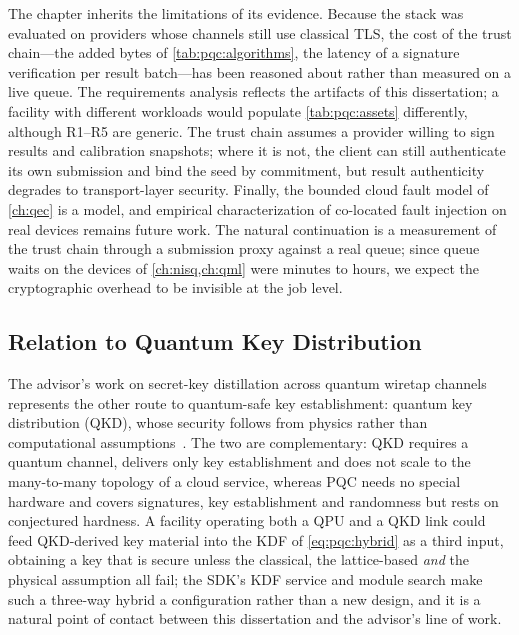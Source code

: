 The chapter inherits the limitations of its evidence. Because the stack was evaluated on providers whose channels still use classical TLS, the cost of the trust chain---the added bytes of \cref{tab:pqc:algorithms}, the latency of a signature verification per result batch---has been reasoned about rather than measured on a live queue. The requirements analysis reflects the artifacts of this dissertation; a facility with different workloads would populate \cref{tab:pqc:assets} differently, although R1--R5 are generic. The trust chain assumes a provider willing to sign results and calibration snapshots; where it is not, the client can still authenticate its own submission and bind the seed by commitment, but result authenticity degrades to transport-layer security. Finally, the bounded cloud fault model of \cref{ch:qec} is a model, and empirical characterization of co-located fault injection on real devices remains future work. The natural continuation is a measurement of the trust chain through a submission proxy against a real queue; since queue waits on the devices of \cref{ch:nisq,ch:qml} were minutes to hours, we expect the cryptographic overhead to be invisible at the job level.

\subsection{Relation to Quantum Key Distribution}\label{sec:pqc:qkd}

The advisor's work on secret-key distillation across quantum wiretap channels~\cite{pan2020secretkey} represents the other route to quantum-safe key establishment: quantum key distribution (QKD), whose security follows from physics rather than computational assumptions~\cite{bennett1984bb84,vazirani2014diqkd}. The two are complementary: QKD requires a quantum channel, delivers only key establishment and does not scale to the many-to-many topology of a cloud service, whereas PQC needs no special hardware and covers signatures, key establishment and randomness but rests on conjectured hardness. A facility operating both a QPU and a QKD link could feed QKD-derived key material into the KDF of \cref{eq:pqc:hybrid} as a third input, obtaining a key that is secure unless the classical, the lattice-based \emph{and} the physical assumption all fail; the SDK's KDF service and module search make such a three-way hybrid a configuration rather than a new design, and it is a natural point of contact between this dissertation and the advisor's line of work.

